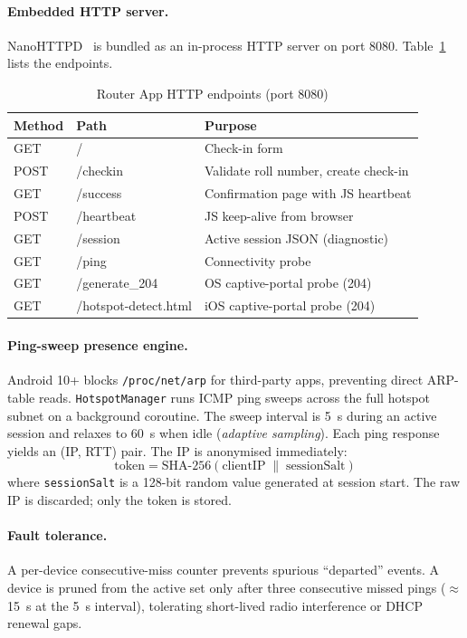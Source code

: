 \documentclass[sigconf,nonacm]{acmart}
\begin{document}
\paragraph{Embedded HTTP server.}
NanoHTTPD~\cite{nanohttpd} is bundled as an in-process HTTP server on
port 8080.  Table~\ref{tab:router-endpoints} lists the endpoints.

\begin{table}[h]
\caption{Router App HTTP endpoints (port 8080)}
\label{tab:router-endpoints}
\begin{tabular}{lll}
\toprule
Method & Path & Purpose \\
\midrule
GET  & /                  & Check-in form \\
POST & /checkin           & Validate roll number, create check-in \\
GET  & /success           & Confirmation page with JS heartbeat \\
POST & /heartbeat         & JS keep-alive from browser \\
GET  & /session           & Active session JSON (diagnostic) \\
GET  & /ping              & Connectivity probe \\
GET  & /generate\_204     & OS captive-portal probe (204) \\
GET  & /hotspot-detect.html & iOS captive-portal probe (204) \\
\bottomrule
\end{tabular}
\end{table}

\paragraph{Ping-sweep presence engine.}
Android 10+ blocks \texttt{/proc/net/arp} for third-party apps,
preventing direct ARP-table reads.  \texttt{HotspotManager} runs ICMP
ping sweeps across the full hotspot subnet on a background coroutine.
The sweep interval is 5~s during an active session and relaxes to 60~s
when idle (\emph{adaptive sampling}).  Each ping response yields an
(IP, RTT) pair.  The IP is anonymised immediately:
%
\begin{equation}
  \text{token} = \text{SHA-256}(\text{clientIP} \;\|\; \text{sessionSalt})
\end{equation}
%
where \texttt{sessionSalt} is a 128-bit random value generated at
session start.  The raw IP is discarded; only the token is stored.

\paragraph{Fault tolerance.}
A per-device consecutive-miss counter prevents spurious ``departed''
events.  A device is pruned from the active set only after three
consecutive missed pings ($\approx$15~s at the 5~s interval),
tolerating short-lived radio interference or DHCP renewal gaps.
\end{document}
